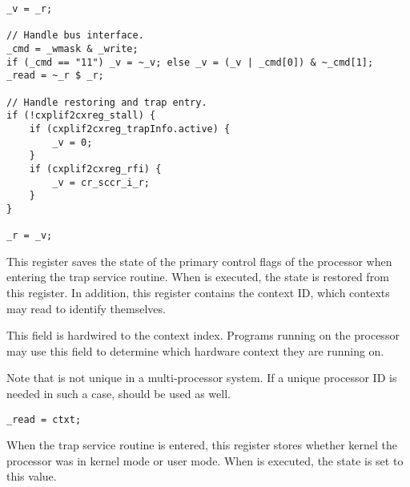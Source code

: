 \declaration{}
\implementation{}
\begin{lstlisting}
_v = _r;

// Handle bus interface.
_cmd = _wmask & _write;
if (_cmd == "11") _v = ~_v; else _v = (_v | _cmd[0]) & ~_cmd[1];
_read = ~_r $ _r;

// Handle restoring and trap entry.
if (!cxplif2cxreg_stall) {
    if (cxplif2cxreg_trapInfo.active) {
        _v = 0;
    }
    if (cxplif2cxreg_rfi) {
        _v = cr_sccr_i_r;
    }
}

_r = _v;
\end{lstlisting}


This register saves the state of the primary control flags of the processor when
entering the trap service routine. When  is executed, the state is
restored from this register. In addition, this register contains the context ID,
which contexts may read to identify themselves.

This field is hardwired to the context index. Programs running on the \rvex{}
processor may use this field to determine which hardware context they are
running on.

Note that  is not unique in a multi-processor system. If a unique
processor ID is needed in such a case,  should be used as well.

\reset{********}
\implementation{}
\begin{lstlisting}
_read = ctxt;
\end{lstlisting}

When the trap service routine is entered, this register stores whether kernel
the processor was in kernel mode or user mode. When  is executed,
the state is set to this value.

